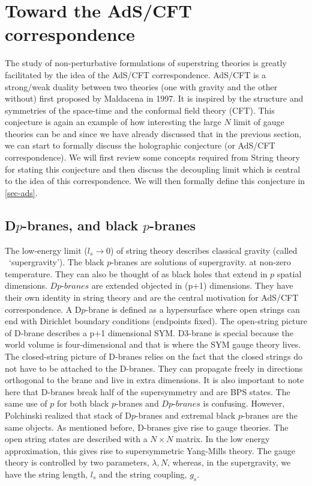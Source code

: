\section{Toward the AdS/CFT correspondence} 
The study of non-perturbative formulations of superstring theories is 
greatly facilitated by the idea of the AdS/CFT correspondence. AdS/CFT is 
a strong/weak duality between two theories (one with gravity and the other without) 
first proposed by Maldacena in 1997. It is inspired by the structure and symmetries of the 
space-time and the conformal field theory (CFT). 
This conjecture is again an example of how interesting the large 
$N$ limit of gauge theories can be and since we have already discussed 
that in the previous section, we can start to formally discuss 
the holographic conjecture (or AdS/CFT correspondence). 
We will first review some concepts required from String theory for stating this conjecture 
and then discuss the decoupling limit which is central to the idea of this 
correspondence. We will then formally define this conjecture in \ref{sec-ads}.  

\subsection{D$p$-branes, and black $p$-branes} 

The low-energy limit ($l_{s} \to 0$) of string theory describes classical gravity (called ~`supergravity'). 
The black $p$-branes are solutions of supergravity. at non-zero temperature. They can also be thought of as black holes that 
extend in $p$ spatial dimensions. 
$\textit{Dp-branes}$ are extended objected in (p+1) dimensions. 
They have their own identity in string theory and are the central motivation for AdS/CFT correspondence. 
A D$p$-brane is defined as a hypersurface where open strings can end with 
Dirichlet boundary conditions (endpoints fixed). 
The open-string picture of D-brane describes a p+1 dimensional SYM. 
D3-brane is special because the world volume is four-dimensional 
and that is where the SYM gauge theory lives. The closed-string picture of 
D-branes relies on the fact that the closed strings do not have to 
be attached to the D-branes. They can propagate freely in directions orthogonal to the brane and live in extra dimensions. 
It is also important to note here that D-branes break half of the supersymmetry and are BPS states. 
The same use of $p$ for both black $p$-branes and $\textit{D$p$-branes}$ is 
confusing. However, Polchinski \cite{Polchinski:1995mt} realized that stack of D$p$-branes 
and extremal black $p$-branes are the same objects.
As mentioned before, D-branes give rise to gauge theories. The open 
string states are described with a $N \times N$ matrix. 
In the low energy approximation, this gives rise to supersymmetric 
Yang-Mills theory. The gauge theory is controlled by two parameters, 
$\lambda, N$, whereas, in the supergravity, we have the string length, $l_{s}$ and the string coupling, $g_{s}$. 

